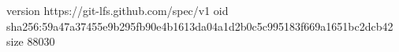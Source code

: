 version https://git-lfs.github.com/spec/v1
oid sha256:59a47a37455e9b295fb90e4b1613da04a1d2b0c5c995183f669a1651bc2dcb42
size 88030
